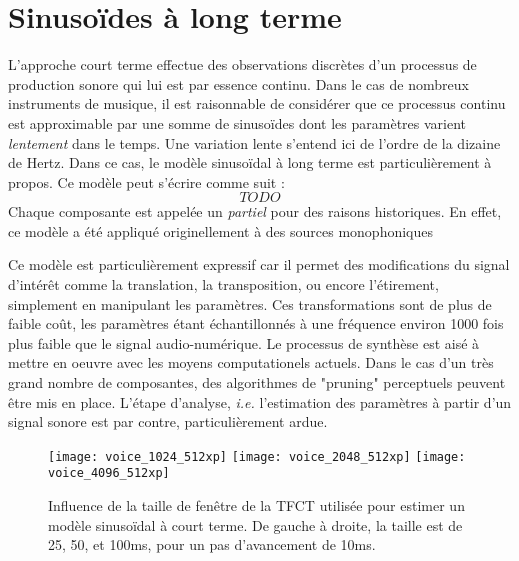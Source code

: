 
\section{ \nmu Sinusoïdes à long terme}  \label{sec:slt}

L'approche court terme effectue des observations discrètes d'un processus de production sonore qui lui est par essence continu. Dans le cas de nombreux instruments de musique, il est raisonnable de considérer que ce processus continu est approximable par une somme de sinusoïdes dont les paramètres varient \textsl{lentement} dans le temps. Une variation lente s'entend ici de l'ordre de la dizaine de Hertz. Dans ce cas, le modèle sinusoïdal à long terme est particulièrement à propos. Ce modèle peut s'écrire comme suit :
\begin{equation}
  TODO
\label{eq:slt}
\end{equation}
Chaque composante est appelée un \textsl{partiel} pour des raisons historiques. En effet, ce modèle a été appliqué originellement à des sources monophoniques

Ce modèle est particulièrement expressif car il permet des modifications du signal d'intérêt comme la translation, la transposition, ou encore l'étirement, simplement en manipulant les paramètres. Ces transformations sont de plus de faible coût, les paramètres étant échantillonnés à une fréquence environ 1000 fois plus faible que le signal audio-numérique. Le processus de synthèse est aisé à mettre en oeuvre avec les moyens computationels actuels. Dans le cas d'un très grand nombre de composantes, des algorithmes de "pruning" perceptuels peuvent être mis en place\cite{lagrangeDafx01}.
L'étape d'analyse, \textit{i.e.} l'estimation des paramètres à partir d'un signal sonore est par contre, particulièrement ardue.

\begin{figure*}
  \texttt{[image: voice\_1024\_512xp]}
  \texttt{[image: voice\_2048\_512xp]}
  \texttt{[image: voice\_4096\_512xp]}
  \caption{Influence de la taille de fenêtre de la TFCT utilisée pour estimer un modèle sinusoïdal à court terme. De gauche à droite, la taille est de 25, 50, et 100ms, pour un pas d'avancement de 10ms.}
  \label{fig:ct}
\end{figure*}

